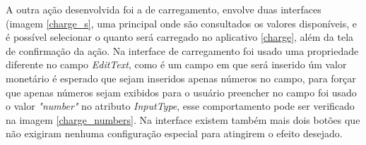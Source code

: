 \documentclass[hidelinks,12pt]{article}
\begin{document}
A outra a\c{c}\~ao desenvolvida foi a de carregamento, envolve duas interfaces (imagem \ref{charge_s}, uma principal onde s\~ao consultados os valores dispon\'iveis, e \'e poss\'ivel selecionar o quanto ser\'a carregado no aplicativo \ref{charge}, al\'em da tela de confirma\c{c}\~ao da a\c{c}\~ao. Na interface de carregamento foi usado uma propriedade diferente no campo \textit{EditText}, como \'e um campo em que ser\'a inserido úm valor monet\'ario \'e esperado que sejam inseridos apenas números no campo, para for\c{c}ar que apenas números sejam exibidos para o usu\'ario preencher no campo foi usado o valor \textit{"number"} no atributo \textit{InputType}, esse comportamento pode ser verificado na imagem \ref{charge_numbers}. Na interface existem tamb\'em mais dois bot\~oes que n\~ao exigiram nenhuma configura\c{c}\~ao especial para atingirem o efeito desejado.
\end{document}

